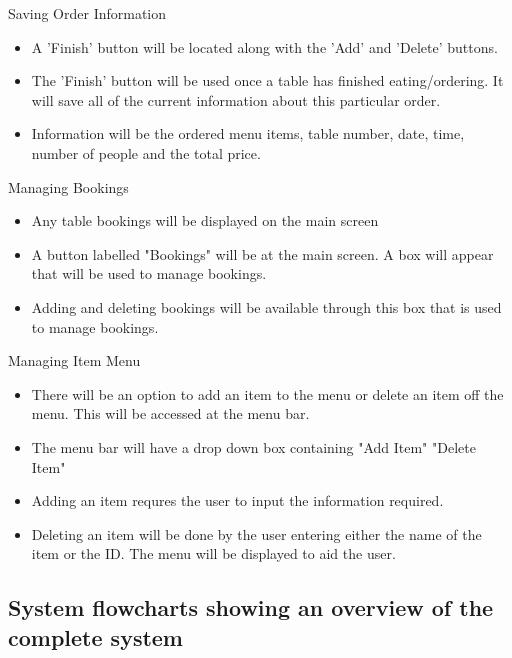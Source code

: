 Saving Order Information
\begin{itemize}
	\item A 'Finish' button will be located along with the 'Add' and 'Delete' buttons. 
	\item The 'Finish' button will be used once a table has finished eating/ordering. It will save all of the current information about this particular order. 
	\item Information will be the ordered menu items, table number, date, time, number of people and the total price.
\end{itemize}

Managing Bookings
\begin{itemize}
	\item Any table bookings will be displayed on the main screen 
	\item A button labelled "Bookings" will be at the main screen. A box will appear that will be used to manage bookings.
	\item Adding and deleting bookings will be available through this box that is used to manage bookings.
\end{itemize}

Managing Item Menu
\begin{itemize}
	\item There will be an option to add an item to the menu or delete an item off the menu. This will be accessed at the menu bar.
	\item The menu bar will have a drop down box containing "Add Item" "Delete Item"
	\item Adding an item requres the user to input the information required.
	\item Deleting an item will be done by the user entering either the name of the item or the ID. The menu will be displayed to aid the user.
\end{itemize}

\subsection{System flowcharts showing an overview of the complete system}

